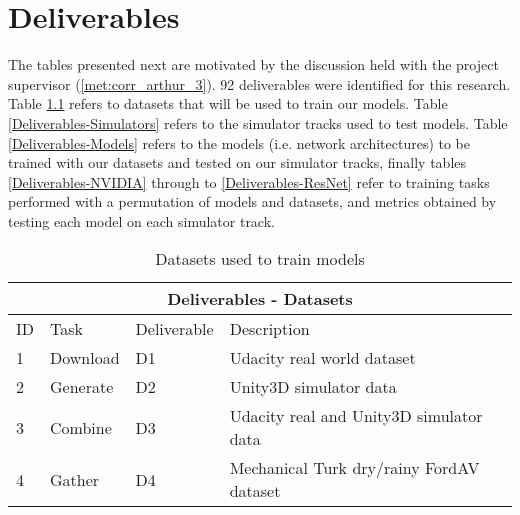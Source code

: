 \chapter{Deliverables} %
\label{AppendixC-deliverables} %
The tables presented next are motivated by the discussion held with the project supervisor (\ref{met:corr_arthur_3}).
92 deliverables were identified for this research. Table \ref{Deliverables-Datasets} refers to datasets that will be used to train our models. Table \ref{Deliverables-Simulators} refers to the simulator tracks used to test models. Table \ref{Deliverables-Models} refers to the models (i.e. network architectures) to be trained with our datasets and tested on our simulator tracks, finally tables \ref{Deliverables-NVIDIA} through to \ref{Deliverables-ResNet} refer to training tasks performed with a permutation of models and datasets, and metrics obtained by testing each model on each simulator track.


\begin{table}[]
\begin{center}
\begin{tabular}{|l|l|l|l|}
\hline
\multicolumn{4}{|c|}{Deliverables - Datasets} \\ \hline


ID & Task &  Deliverable & Description \\ \hline\hline
1 & Download & D1 &  Udacity real world dataset  \\ \hline
2 & Generate & D2 &  Unity3D simulator data  \\ \hline
3 & Combine & D3 &  Udacity real and Unity3D simulator data  \\ \hline
4 & Gather & D4 &  Mechanical Turk dry/rainy FordAV dataset  \\ \hline

\end{tabular}
\end{center}
\caption{Datasets used to train models}
\label{Deliverables-Datasets}
\end{table}


